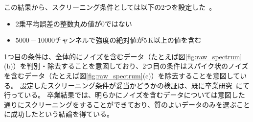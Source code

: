 この結果から、スクリーニング条件としては以下の2つを設定した~\cite{goto2021bachelor}。
\begin{itemize}
    \item 2乗平均誤差の整数丸め値が0ではない
    \item $5000-10000$チャンネルで強度の絶対値が$5\, \mathrm{K}$以上の値を含む
\end{itemize} \par
1つ目の条件は、全体的にノイズを含むデータ（たとえば図\ref{fig:raw_spectrum}(b)）を判別・除去することを意図しており、2つ目の条件はスパイク状のノイズを含むデータ（たとえば図\ref{fig:raw_spectrum}(c)）を除去することを意図している。
設定したスクリーニング条件が妥当かどうかの検証は、既に卒業研究~\cite{goto2021bachelor}にて行っている。
卒業結果では、明らかにノイズを含むデータについては意図した通りにスクリーニングをすることができており、質のよいデータのみを選ぶことに成功したという結論を得ている。


